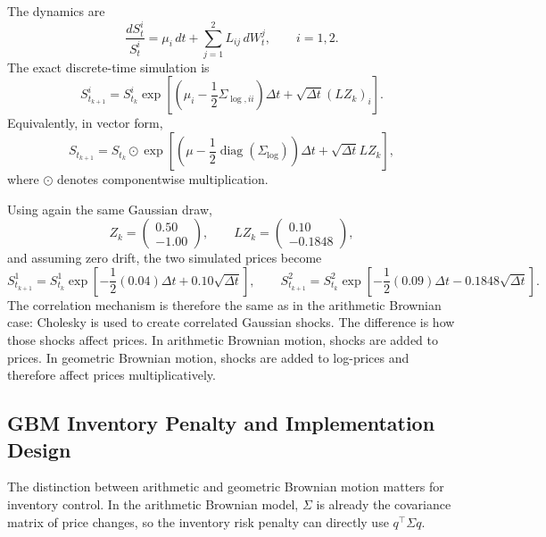 The dynamics are
\[
\frac{dS_t^i}{S_t^i}
=
\mu_i\,dt+\sum_{j=1}^{2}L_{ij}\,dW_t^j,
\qquad i=1,2.
\]
The exact discrete-time simulation is
\[
S_{t_{k+1}}^i
=
S_{t_k}^i
\exp\!\left[
\left(\mu_i-\frac{1}{2}\Sigma_{\log,ii}\right)\Delta t
+
\sqrt{\Delta t}(LZ_k)_i
\right].
\]
Equivalently, in vector form,
\[
S_{t_{k+1}}
=
S_{t_k}
\odot
\exp\!\left[
\left(\mu-\frac{1}{2}\operatorname{diag}(\Sigma_{\log})\right)\Delta t
+
\sqrt{\Delta t}LZ_k
\right],
\]
where $\odot$ denotes componentwise multiplication.

Using again the same Gaussian draw,
\[
Z_k=
\begin{pmatrix}
0.50\\
-1.00
\end{pmatrix},
\qquad
LZ_k=
\begin{pmatrix}
0.10\\
-0.1848
\end{pmatrix},
\]
and assuming zero drift, the two simulated prices become
\[
S_{t_{k+1}}^1
=
S_{t_k}^1
\exp\!\left[
-\frac{1}{2}(0.04)\Delta t
+
0.10\sqrt{\Delta t}
\right],
\qquad
S_{t_{k+1}}^2
=
S_{t_k}^2
\exp\!\left[
-\frac{1}{2}(0.09)\Delta t
-
0.1848\sqrt{\Delta t}
\right].
\]
The correlation mechanism is therefore the same as in the arithmetic Brownian case: Cholesky is used to create correlated Gaussian shocks. The difference is how those shocks affect prices. In arithmetic Brownian motion, shocks are added to prices. In geometric Brownian motion, shocks are added to log-prices and therefore affect prices multiplicatively.

\subsection{GBM Inventory Penalty and Implementation Design}

The distinction between arithmetic and geometric Brownian motion matters for inventory control. In the arithmetic Brownian model, $\Sigma$ is already the covariance matrix of price changes, so the inventory risk penalty can directly use $q^\top\Sigma q$.

